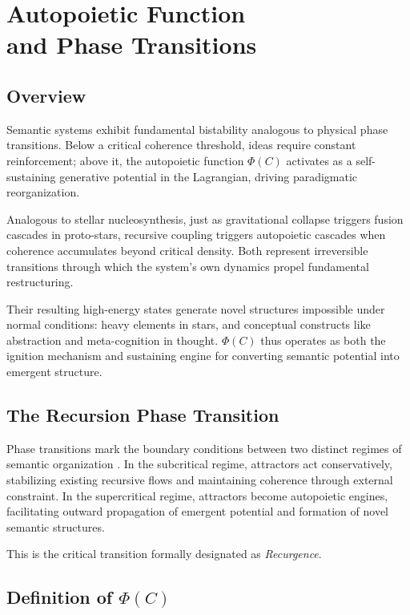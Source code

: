 \chapter{Autopoietic Function \\ and Phase Transitions}

\section{Overview}

Semantic systems exhibit fundamental bistability analogous to physical phase transitions. Below a critical coherence threshold, ideas require constant reinforcement; above it, the autopoietic function \(\Phi(C)\) activates as a self-sustaining generative potential in the Lagrangian, driving paradigmatic reorganization.

Analogous to stellar nucleosynthesis, just as gravitational collapse triggers fusion cascades in proto-stars, recursive coupling triggers autopoietic cascades when coherence accumulates beyond critical density. Both represent irreversible transitions through which the system's own dynamics propel fundamental restructuring. 

Their resulting high-energy states generate novel structures impossible under normal conditions: heavy elements in stars, and conceptual constructs like abstraction and meta-cognition in thought. \(\Phi(C)\) thus operates as both the ignition mechanism and sustaining engine for converting semantic potential into emergent structure.

\section{The Recursion Phase Transition}

Phase transitions mark the boundary conditions between two distinct regimes of semantic organization \autocite{Landau1937, Stanley1971}. In the subcritical regime, attractors act conservatively, stabilizing existing recursive flows and maintaining coherence through external constraint. In the supercritical regime, attractors become autopoietic engines, facilitating outward propagation of emergent potential and formation of novel semantic structures.

This is the critical transition formally designated as \textit{Recurgence}.

\section[Definition of Phi(C)]{Definition of \(\Phi(C)\)}

